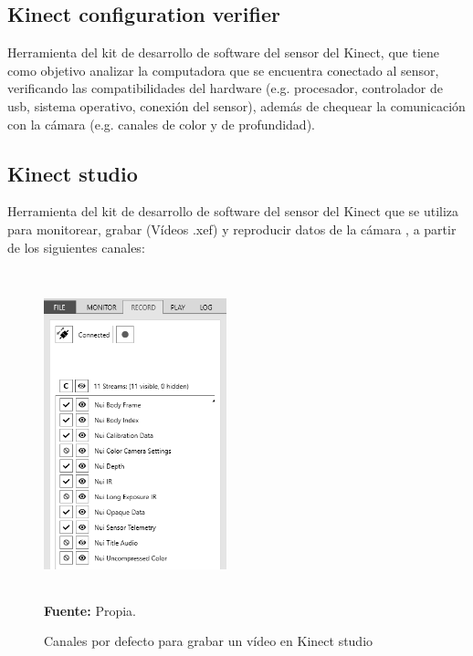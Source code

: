 \subsection{Kinect configuration verifier} \label{ins:KinectCheckt}
Herramienta del kit de desarrollo de software del sensor del Kinect, que tiene como objetivo  analizar la computadora que se encuentra conectado al sensor, verificando las compatibilidades del hardware (e.g. procesador, controlador de usb, sistema operativo, conexi\'on del sensor), adem\'as de chequear la comunicaci\'on con la c\'amara (e.g. canales de color y de profundidad).
\subsection{Kinect studio} \label{ins:KinectStudio}
Herramienta del kit de desarrollo de software del sensor del Kinect que se utiliza para monitorear, grabar (V\'ideos .xef) y reproducir datos de la c\'amara \cite{KinectStudio2019}, a partir de los siguientes canales:
\begin{figure}[H]
	\caption{Canales por defecto para grabar un v\'ideo en Kinect studio }
	\label{fig:streamDefault}
	\centering
	\includegraphics[width=200px,height=360px]{graphics/streamsRecord.PNG} \\
	\textbf{Fuente:} Propia.
\end{figure} 
